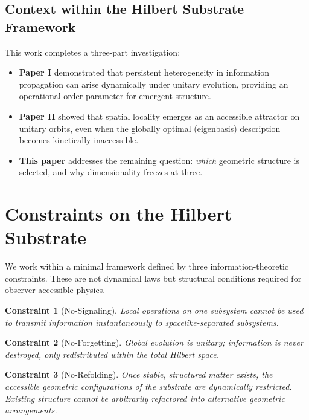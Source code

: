\documentclass[11pt]{article}
\newtheorem{constraint}{Constraint}
\begin{document}
\subsection{Context within the Hilbert Substrate Framework}

This work completes a three-part investigation:

\begin{itemize}
\item \textbf{Paper I} demonstrated that persistent heterogeneity in information propagation can arise dynamically under unitary evolution, providing an operational order parameter for emergent structure.
\item \textbf{Paper II} showed that spatial locality emerges as an accessible attractor on unitary orbits, even when the globally optimal (eigenbasis) description becomes kinetically inaccessible.
\item \textbf{This paper} addresses the remaining question: \emph{which} geometric structure is selected, and why dimensionality freezes at three.
\end{itemize}

\section{Constraints on the Hilbert Substrate}

We work within a minimal framework defined by three information-theoretic constraints. These are not dynamical laws but structural conditions required for observer-accessible physics.

\begin{constraint}[No-Signaling]
Local operations on one subsystem cannot be used to transmit information instantaneously to spacelike-separated subsystems.
\end{constraint}

\begin{constraint}[No-Forgetting]
Global evolution is unitary; information is never destroyed, only redistributed within the total Hilbert space.
\end{constraint}

\begin{constraint}[No-Refolding]
Once stable, structured matter exists, the accessible geometric configurations of the substrate are dynamically restricted. Existing structure cannot be arbitrarily refactored into alternative geometric arrangements.
\end{constraint}
\end{document}
